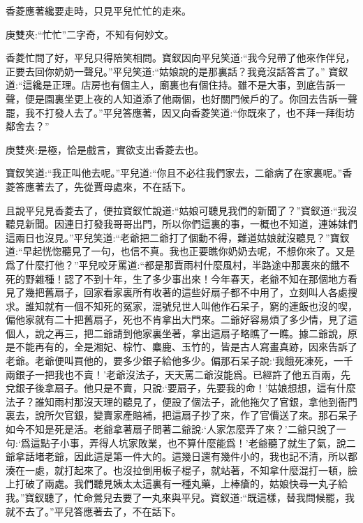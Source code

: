 \begin{parag}
    香菱應著纔要走時，只見平兒忙忙的走來。\begin{note}庚雙夾:“忙忙”二字奇，不知有何妙文。\end{note}香菱忙問了好，平兒只得陪笑相問。寶釵因向平兒笑道:“我今兒帶了他來作伴兒，正要去回你奶奶一聲兒。”平兒笑道:“姑娘說的是那裏話？我竟沒話答言了。” 寶釵道:“這纔是正理。店房也有個主人，廟裏也有個住持。雖不是大事，到底告訴一聲，便是園裏坐更上夜的人知道添了他兩個，也好關門候戶的了。你回去告訴一聲罷，我不打發人去了。”平兒答應著，因又向香菱笑道:“你既來了，也不拜一拜街坊鄰舍去？”\begin{note}庚雙夾:是極，恰是戲言，實欲支出香菱去也。\end{note}寶釵笑道:“我正叫他去呢。”平兒道:“你且不必往我們家去，二爺病了在家裏呢。”香菱答應著去了，先從賈母處來，不在話下。
\end{parag}


\begin{parag}
    且說平兒見香菱去了，便拉寶釵忙說道:“姑娘可聽見我們的新聞了？”寶釵道:“我沒聽見新聞。因連日打發我哥哥出門，所以你們這裏的事，一概也不知道，連姊妹們這兩日也沒見。”平兒笑道:“老爺把二爺打了個動不得，難道姑娘就沒聽見？”寶釵道:“早起恍惚聽見了一句，也信不真。我也正要瞧你奶奶去呢，不想你來了。又是爲了什麼打他？”平兒咬牙罵道:“都是那賈雨村什麼風村，半路途中那裏來的餓不死的野雜種！認了不到十年，生了多少事出來！今年春天，老爺不知在那個地方看見了幾把舊扇子，回家看家裏所有收著的這些好扇子都不中用了，立刻叫人各處搜求。誰知就有一個不知死的冤家，混號兒世人叫他作石呆子，窮的連飯也沒的喫，偏他家就有二十把舊扇子，死也不肯拿出大門來。二爺好容易煩了多少情，見了這個人，說之再三，把二爺請到他家裏坐著，拿出這扇子略瞧了一瞧。據二爺說，原是不能再有的，全是湘妃、棕竹、麋鹿、玉竹的，皆是古人寫畫真跡，因來告訴了老爺。老爺便叫買他的，要多少銀子給他多少。偏那石呆子說:‘我餓死凍死，一千兩銀子一把我也不賣！’老爺沒法子，天天罵二爺沒能爲。已經許了他五百兩，先兌銀子後拿扇子。他只是不賣，只說:‘要扇子，先要我的命！’姑娘想想，這有什麼法子？誰知雨村那沒天理的聽見了，便設了個法子，訛他拖欠了官銀，拿他到衙門裏去，說所欠官銀，變賣家產賠補，把這扇子抄了來，作了官價送了來。那石呆子如今不知是死是活。老爺拿著扇子問著二爺說:‘人家怎麼弄了來？’二爺只說了一句:‘爲這點子小事，弄得人坑家敗業，也不算什麼能爲！’老爺聽了就生了氣，說二爺拿話堵老爺，因此這是第一件大的。這幾日還有幾件小的，我也記不清，所以都湊在一處，就打起來了。也沒拉倒用板子棍子，就站著，不知拿什麼混打一頓，臉上打破了兩處。我們聽見姨太太這裏有一種丸藥，上棒瘡的，姑娘快尋一丸子給我。”寶釵聽了，忙命鶯兒去要了一丸來與平兒。寶釵道:“既這樣，替我問候罷，我就不去了。”平兒答應著去了，不在話下。
\end{parag}


